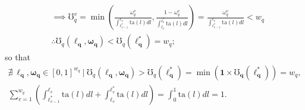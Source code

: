 \documentclass[hidelinks, nonatbib]{elsarticle}
\begin{document}
\begin{enumerate}
\begin{align}
        \\
        &\implies
        \mho_{q}^{v} = 
        \min\left(
            \frac{
                \omega_{q}^{v}
            }{
                \int_{
                    \ell_{v-1}^{*}
                }^{
                    \ell_{v}
                }
                \text{ta}(l)dl
            }
            ,
            \frac{
                1-\omega_{q}^{v}
            }{
                \int_{
                    \ell_{v}
                }^{
                    \ell_{v}^{*}
                }
                \text{ta}(l)dl
            }
        \right)
        =
        \frac{
            \omega_{q}^{v}
        }{
            \int_{
                \ell_{v-1}^{*}
            }^{
                \ell_{v}
            }
            \text{ta}(l)dl
        }
        <
        w_q
        \\
        &\therefore
        \mho_{q}(
            \boldsymbol{\ell_q}
            ,\boldsymbol{\omega_q}
        ) 
        <
        \mho_{q}(
            \boldsymbol{\ell_{q}^{*}}
        )
        =
        w_q
        ;
    \end{align}
    so that 
    \begin{gather}
        \nexists
        \
        \boldsymbol{\ell_q}
        ,
        \boldsymbol{\omega_q}
        \in
        [0,1]^{w_q}
        \
        \big|
        \
        \mho_{q}(
            \boldsymbol{\ell_q}
            ,\boldsymbol{\omega_q}
        ) 
        >
        \mho_{q}(
            \boldsymbol{\ell_{q}^{*}}
        )
        =
        \min(
            \boldsymbol{1}
            \times
            \boldsymbol{\mho_q}(
                \boldsymbol{\ell_{q}^{*}}
            )
        )
        =
        w_q
        ,
        \\
        \sum_{v=1}^{w_q}
        \left(
            \int_{
                \ell_{v-1}^{*}
            }^{
                \ell_{v}
            }
            \text{ta}(l)dl
            +
            \int_{
                \ell_{v}
            }^{
                \ell_{v}^{*}
            }
            \text{ta}(l)dl
        \right)
        =
        \int_{0}^{1}
        \text{ta}(l)dl
        =
        1
        .
    \end{gather}


\end{enumerate}
\end{document}
